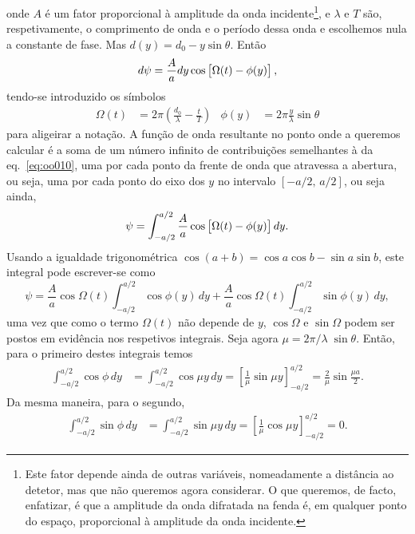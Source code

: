 onde $A$ é um fator proporcional à amplitude da onda incidente\footnote{Este
    fator depende ainda de outras variáveis, nomeadamente a distância ao
    detetor, mas que não queremos agora considerar. O que queremos, de facto,
    enfatizar, é que a amplitude da onda difratada na fenda é, em qualquer ponto
do espaço, proporcional à amplitude da onda incidente.}, e $\lambda$ e $T$ são, respetivamente,
o comprimento de onda e o período dessa onda e escolhemos nula a constante de
fase.  Mas $d(y)=d_0-y\sin\theta$. Então
\begin{equation}
    d\psi = \frac{A}{a} dy\cos\left[\Omega(t)-\strut\phi(y)\right],\label{eq:oo010}
\end{equation}
tendo-se introduzido os símbolos
\begin{align*}
    \Omega(t)&=2\pi\left(\frac{d_0}{\lambda}-\frac{t}{T}\right)&
    \phi(y)&=2\pi \frac y \lambda \sin\theta
\end{align*}
para aligeirar a notação. A função de onda resultante no ponto onde a queremos
calcular é a soma de um número infinito de contribuições semelhantes à da
eq.~\eqref{eq:oo010}, uma por cada ponto da frente de onda que atravessa a
abertura, ou seja, uma por cada ponto do eixo dos $y$ no intervalo
$[-a/2,\,a/2]$, ou seja ainda,
\begin{equation*}
    \psi=\int_{-a/2}^{a/2}\frac{A}{a}\cos\left[\strut\Omega(t)-\phi(y)\right]dy.
\end{equation*}
Usando a igualdade trigonométrica $\cos(a+b)=\cos a\cos b-\sin a\sin b$, este
integral pode escrever-se como
\begin{equation*}
    \psi=\frac{A}{a}\cos\Omega(t)\int_{-a/2}^{a/2}\cos\phi(y)\,dy+
         \frac{A}{a}\cos\Omega(t)\int_{-a/2}^{a/2}\sin\phi(y)\,dy,
\end{equation*}
uma vez que como o termo $\Omega(t)$ não depende de $y$, $\cos\Omega$ e
$\sin\Omega$ podem ser postos em evidência nos respetivos integrais. Seja agora
$\mu=2\pi/\lambda\;\sin\theta$. Então, para o primeiro destes integrais temos
\begin{align*}
    \int_{-a/2}^{a/2}\cos\phi\,dy&=\int_{-a/2}^{a/2}\cos\mu y\,dy=
    \left[\frac{1}{\mu}\sin\mu y\right]_{-a/2}^{a/2}=
    \frac2{\mu}\sin\frac{\mu a}2.
\end{align*}
Da mesma maneira, para o segundo,
\begin{align*}
    \int_{-a/2}^{a/2}\sin\phi\,dy&=\int_{-a/2}^{a/2}\sin\mu y\,dy=
    \left[\frac{1}{\mu}\cos\mu y\right]_{-a/2}^{a/2}=0.
\end{align*}
